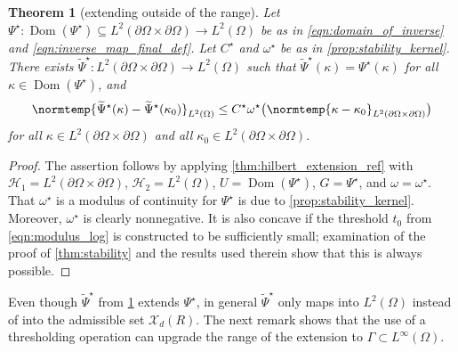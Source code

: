 \documentclass[pdflatex,sn-mathphys-num]{sn-jnl-preprint}
\newcommand{\cH}{\mathcal{H}}
\newcommand{\cX}{\mathcal{X}}
\newcommand{\pOmega}{{\partial\Omega}}
\newcommand{\norm}{\normtemp}
\DeclareMathOperator{\domain}{Dom} %
\theoremstyle{thmstyleone}%
\newtheorem{theorem}{Theorem}[section]%
\theoremstyle{thmstyletwo}%
\theoremstyle{thmstylethree}%
\numberwithin{equation}{section}
\numberwithin{theorem}{section}
\begin{document}
\begin{theorem}[extending outside of the range]\label{thm:extension_eit_kernel}
    Let $\Psi^\star\colon\domain(\Psi^\star)\subseteq L^2(\pOmega\times\pOmega)\to L^2(\Omega)$ be as in \eqref{eqn:domain_of_inverse} and \eqref{eqn:inverse_map_final_def}. Let $C^\star$ and $\omega^\star$ be as in \cref{prop:stability_kernel}. There exists $\widetilde{\Psi}^\star\colon L^2(\pOmega\times\pOmega)\to L^2(\Omega)$ such that $\widetilde{\Psi}^\star(\kappa)=\Psi^\star(\kappa)$ for all $\kappa\in\domain(\Psi^\star)$, and
    \begin{align}\label{eqn:stability_kernel_out}
        \norm{\widetilde{\Psi}^\star(\kappa)-\widetilde{\Psi}^\star(\kappa_0)}_{L^2(\Omega)}\leq C^\star \omega^\star\bigl(\norm{\kappa-\kappa_0}_{L^2(\partial\Omega\times\pOmega)}\bigr)
    \end{align}
    for all $\kappa\in L^2(\pOmega\times\pOmega)$ and all $\kappa_0\in L^2(\pOmega\times\pOmega)$.
\end{theorem}
\begin{proof}
    The assertion follows by applying \cref{thm:hilbert_extension_ref} with $\cH_1=L^2(\pOmega\times\pOmega)$, $\cH_2=L^2(\Omega)$, $U=\domain(\Psi^\star)$, $G=\Psi^\star$, and $\omega=\omega^\star$. That $\omega^\star$ is a modulus of continuity for $\Psi^\star$ is due to \cref{prop:stability_kernel}. Moreover, $\omega^\star$ is clearly nonnegative. It is also concave if the threshold $t_0$ from \eqref{eqn:modulus_log} is constructed to be sufficiently small; examination of the proof of \cref{thm:stability} and the results used therein show that this is always possible.
\end{proof}

Even though $\widetilde{\Psi}^\star$ from \cref{thm:extension_eit_kernel} extends $\Psi^\star$, in general $\widetilde{\Psi}^\star$ only maps into $L^2(\Omega)$ instead of into the admissible set $\cX_d(R)$. The next remark shows that the use of a thresholding operation can upgrade the range of the extension to $\Gamma\subset L^\infty(\Omega)$.
\end{document}
